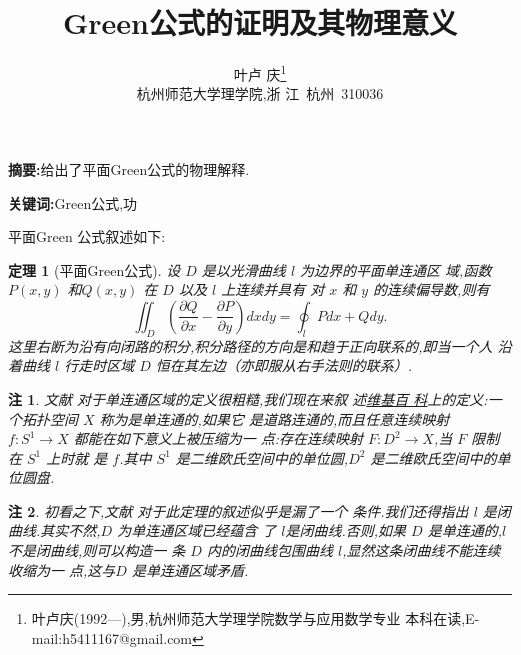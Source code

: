 \documentclass[twoside,11pt]{article}
\newtheorem{theorem}{定理}
\newtheorem{remark}{注}
\newcommand{\pa}{\partial} \newcommand{\Om}{\Omega}
\begin{document}
\title{\huge{\textbf{Green公式的证明及其物理意义}}} \author{\small{叶卢
    庆\footnote{叶卢庆(1992---),男,杭州师范大学理学院数学与应用数学专业
      本科在读,E-mail:h5411167@gmail.com}}\\{\small{杭州师范大学理学院,浙
      江~杭州~310036}}} \date{}
\maketitle



\textbf{\small{摘要}:}给出了平面Green公式的物理解释. \smallskip

\textbf{\small{关键词}:}Green公式,功\smallskip


\vspace{30pt} %

平面Green 公式叙述如下:
\begin{theorem}[平面Green公式\cite{ouyangguangzhong}]
  设 $D$ 是以光滑曲线 $l$ 为边界的平面单连通区
  域,函数 $P(x,y)$ 和$Q(x,y)$ 在 $D$ 以及 $l$ 上连续并具有
  对 $x$ 和 $y$ 的连续偏导数,则有
$$
\iint_D \left(\frac{\pa Q}{\pa x}-\frac{\pa P}{\pa
    y}\right)dxdy=\oint_l Pdx+Qdy.
$$
这里右断为沿有向闭路的积分,积分路径的方向是和趋于正向联系的,即当一个人
沿着曲线 $l$ 行走时区域 $D$ 恒在其左边（亦即服从右手法则的联系）.
\end{theorem}
\begin{remark}
  文献 \cite{ouyangguangzhong} 对于单连通区域的定义很粗糙,我们现在来叙
  述\href{http://en.wikipedia.org/wiki/Simply_connected_space}{维基百
    科}上的定义:一个拓扑空间 $X$ 称为是单连通的,如果它
  是道路连通的,而且任意连续映射 $f:S^1\to X$ 都能在如下意义上被压缩为一
  点:存在连续映射 $F:D^2\to X$,当 $F$ 限制在 $S^1$ 上时就
  是 $f$.其中 $S^1$ 是二维欧氏空间中的单位圆,$D^2$ 是二维欧氏空间中的单
  位圆盘.
\end{remark}
\begin{remark}
  初看之下,文献 \cite{ouyangguangzhong} 对于此定理的叙述似乎是漏了一个
  条件.我们还得指出 $l$ 是闭曲线.其实不然,$D$ 为单连通区域已经蕴含
  了 $l$是闭曲线.否则,如果 $D$ 是单连通的,$l$ 不是闭曲线,则可以构造一
  条 $D$ 内的闭曲线包围曲线 $l$,显然这条闭曲线不能连续收缩为一
  点,这与$D$ 是单连通区域矛盾.
\end{remark}
\end{document}
